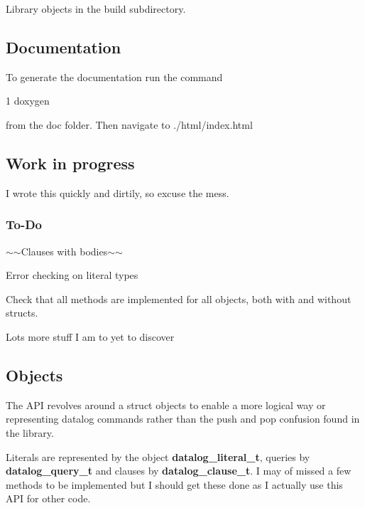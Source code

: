 Library objects in the build subdirectory.

\subsection*{Documentation}

To generate the documentation run the command


\begin{DoxyCode}
1 doxygen
\end{DoxyCode}
 from the doc folder. Then navigate to ./html/index.html

\subsection*{Work in progress}

I wrote this quickly and dirtily, so excuse the mess.

\subsubsection*{To-\/\+Do}


\begin{DoxyItemize}
\item $\sim$$\sim$\+Clauses with bodies$\sim$$\sim$
\item Error checking on literal types
\item Check that all methods are implemented for all objects, both with and without structs.
\item Lots more stuff I am to yet to discover
\end{DoxyItemize}

\subsection*{Objects}

The A\+PI revolves around a struct objects to enable a more logical way or representing datalog commands rather than the push and pop confusion found in the library.

Literals are represented by the object {\bfseries datalog\+\_\+literal\+\_\+t}, queries by {\bfseries datalog\+\_\+query\+\_\+t} and clauses by {\bfseries datalog\+\_\+clause\+\_\+t}. I may of missed a few methods to be implemented but I should get these done as I actually use this A\+PI for other code. 